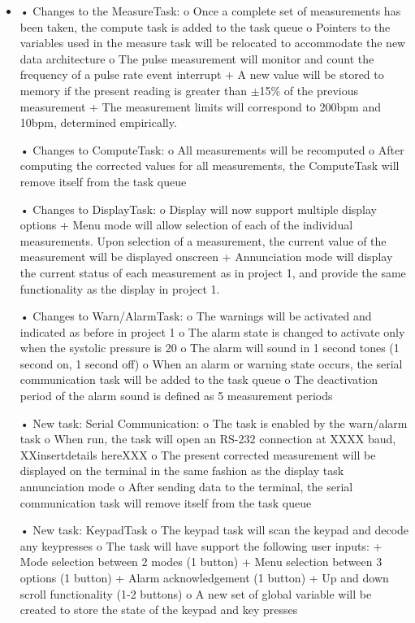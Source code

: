 \documentclass[12pt]{article} %
\begin{document}
\begin{itemize}
  \item
•	Changes to the MeasureTask:
o	Once a complete set of measurements has been taken, the compute task is added to the task queue
o	Pointers to the variables used in the measure task will be relocated to accommodate the new data architecture
o	The pulse measurement will monitor and count the frequency of a pulse rate event interrupt
+	A new value will be stored to memory if the present reading is greater than $\pm$15\% of the previous measurement
+	The measurement limits will correspond to 200bpm and 10bpm, determined empirically. 

•	Changes to ComputeTask:
o	All measurements will be recomputed
o	After computing the corrected values for all measurements, the ComputeTask will remove itself from the task queue

•	Changes to DisplayTask:
o	Display will now support multiple display options
+	Menu mode will allow selection of each of the individual measurements. Upon selection of a measurement, the current value of the measurement will be displayed onscreen
+	Annunciation mode will display the current status of each measurement as in project 1, and provide the same functionality as the display in project 1.

•	Changes to Warn/AlarmTask:
o	The warnings will be activated and indicated as before in project 1
o	The alarm state is changed to activate only when the systolic pressure is 20%
o	The alarm will sound in 1 second tones (1 second on, 1 second off)
o	When an alarm or warning state occurs, the serial communication task will be added to the task queue
o	The deactivation period of the alarm sound is defined as 5 measurement periods

•	New task: Serial Communication:
o	The task is enabled by the warn/alarm task
o	When run, the task will open an RS-232 connection at XXXX baud, XXinsertdetails hereXXX
o	The present corrected measurement will be displayed on the terminal in the same fashion as the display task annunciation mode
o	After sending data to the terminal, the serial communication task will remove itself from the task queue

•	New task: KeypadTask
o	The keypad task will scan the keypad and decode any keypresses
o	The task will have support the following user inputs:
+	Mode selection between 2 modes (1 button)
+	Menu selection between 3 options (1 button)
+	Alarm acknowledgement (1 button)
+	Up and down scroll functionality (1-2 buttons)
o	A new set of global variable will be created to store the state of the keypad and key presses


\end{itemize}
\end{document}

